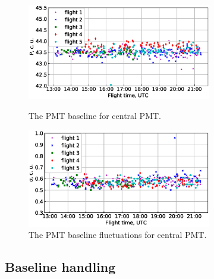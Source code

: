 \documentclass[final,5p,times,twocolumn]{elsarticle}
\begin{document}
\begin{figure}[t]
\centering
\begin{minipage}[t]{0.5\textwidth}
\includegraphics[width=19pc]{figs/pied_PMT1.eps}
\vspace{-1.0pc}
\caption{The PMT baseline for central PMT.}
\label{fig:pied}
\end{minipage}
\vfill
\vspace{1pc}
\begin{minipage}[t]{0.5\textwidth}
\includegraphics[width=19pc]{figs/piedfluct_PMT1.eps}
\vspace{-1.0pc}
\caption{The PMT baseline fluctuations for central PMT.}
\label{fig:piedfluct}
\end{minipage}
\end{figure}




\subsection{Baseline handling}
\end{document}
